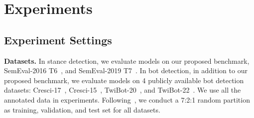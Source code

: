 \documentclass[10pt,twocolumn,letterpaper]{article}
\begin{document}
\begin{table}[htbp]
  \centering
  \caption{Relations in the MGTAB heterogeneous graph.}
  \vspace{0.2cm}
  \label{tab:5}\end{table}



\section{Experiments}
\subsection{Experiment Settings}

\noindent
\textbf{Datasets.}
In stance detection, we evaluate models on our proposed benchmark, SemEval-2016 T6~\cite{Alpher21}, and SemEval-2019 T7~\cite{Alpher25}. In bot detection, in addition to our proposed benchmark, we evaluate models on 4 publicly available bot detection datasets: Cresci-17~\cite{Alpher04}, Cresci-15~\cite{Alpher10}, TwiBot-20~\cite{Alpher11}, and TwiBot-22~\cite{Alpher12}. We use all the annotated data in experiments. Following~\cite{Alpher11,Alpher12}, we conduct a 7:2:1 random partition as training, validation, and test set for all datasets.
\end{document}
